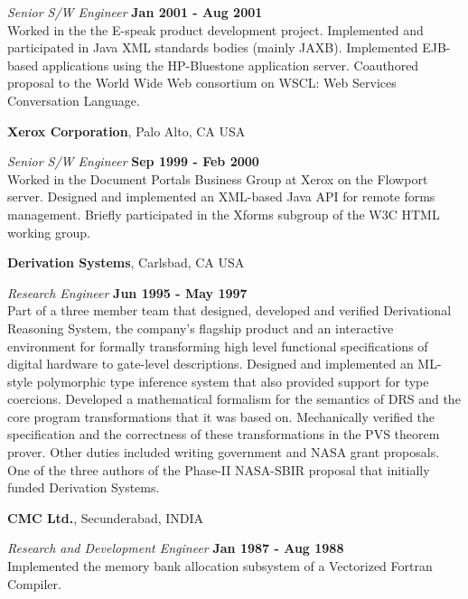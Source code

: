 \documentclass[11pt,margin,line]{res}
\begin{document}
\begin{resume}
{\em Senior S/W Engineer} \hfill {\bf Jan 2001 - Aug 2001}\\
Worked in the the E-speak product development project.
Implemented and participated in Java XML standards bodies
(mainly JAXB).  Implemented EJB-based applications using the
HP-Bluestone application server.  Coauthored proposal to the
World Wide Web consortium on WSCL: Web Services Conversation
Language.

{\bf Xerox Corporation}, Palo Alto, CA USA

\vspace{-.5cm}

{\em Senior S/W Engineer} \hfill {\bf Sep 1999 - Feb 2000}\\
Worked in the Document Portals Business Group at Xerox on the
Flowport server.  Designed and implemented an XML-based Java API
for remote forms management.  Briefly participated in the Xforms
subgroup of the W3C HTML working group.

{\bf Derivation Systems}, Carlsbad, CA USA

\vspace{-.5cm}

{\em Research Engineer} \hfill {\bf Jun 1995 - May 1997}\\ 
Part of a three member team that designed, developed and
verified Derivational Reasoning System, the company's
flagship product and an interactive environment for formally
transforming high level functional specifications of digital
hardware to gate-level descriptions.
Designed and implemented an ML-style
polymorphic type inference system that also provided support for
type coercions.  Developed a mathematical formalism for the
semantics of DRS and the core program transformations that it
was based on.
Mechanically verified the specification and the
correctness of these transformations in the PVS theorem prover.
Other duties included writing government and NASA grant
proposals.  One of the three authors of the Phase-II NASA-SBIR
proposal that initially funded Derivation Systems.


{\bf CMC Ltd.}, Secunderabad, INDIA

\vspace{-.5cm}

{\em Research and Development Engineer} \hfill {\bf Jan 1987 -
Aug 1988}\\ 
Implemented the memory bank allocation subsystem of
a Vectorized Fortran Compiler.



\end{resume}
\end{document}
